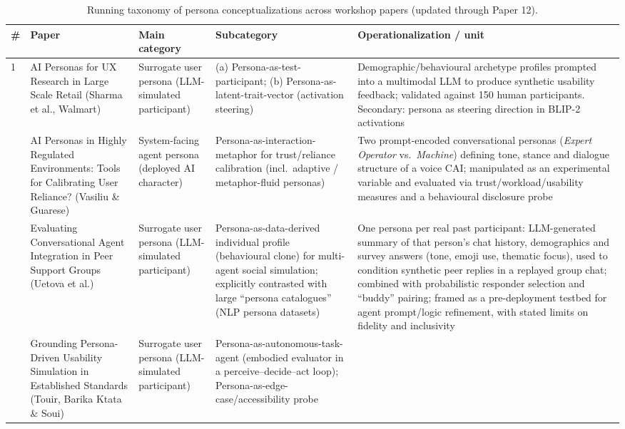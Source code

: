\begin{table}[t]
\centering
\caption{Running taxonomy of persona conceptualizations across workshop papers (updated through Paper 12).}
\label{tab:persona-taxonomy}
\small
\begin{tabular}{p{0.5cm} p{3.6cm} p{3.4cm} p{3.6cm} p{3.6cm}}
\toprule
\textbf{\#} & \textbf{Paper} & \textbf{Main category} & \textbf{Subcategory} & \textbf{Operationalization / unit} \\
\midrule
1 & AI Personas for UX Research in Large Scale Retail (Sharma et al., Walmart) &
Surrogate user persona (LLM-simulated participant) &
(a) Persona-as-test-participant; (b) Persona-as-latent-trait-vector (activation steering) &
Demographic/behavioural archetype profiles prompted into a multimodal LLM to produce synthetic usability feedback; validated against 150 human participants. Secondary: persona as steering direction in BLIP-2 activations \\
\addlinespace
2 & AI Personas in Highly Regulated Environments: Tools for Calibrating User Reliance? (Vasiliu \& Guarese) &
System-facing agent persona (deployed AI character) &
Persona-as-interaction-metaphor for trust/reliance calibration (incl.\ adaptive / metaphor-fluid personas) &
Two prompt-encoded conversational personas (\textit{Expert Operator} vs.\ \textit{Machine}) defining tone, stance and dialogue structure of a voice CAI; manipulated as an experimental variable and evaluated via trust/workload/usability measures and a behavioural disclosure probe \\
\addlinespace
3 & Evaluating Conversational Agent Integration in Peer Support Groups (Uetova et al.) &
Surrogate user persona (LLM-simulated participant) &
Persona-as-data-derived individual profile (behavioural clone) for multi-agent social simulation; explicitly contrasted with large ``persona catalogues'' (NLP persona datasets) &
One persona per real past participant: LLM-generated summary of that person's chat history, demographics and survey answers (tone, emoji use, thematic focus), used to condition synthetic peer replies in a replayed group chat; combined with probabilistic responder selection and ``buddy'' pairing; framed as a pre-deployment testbed for agent prompt/logic refinement, with stated limits on fidelity and inclusivity \\
\addlinespace
4 & Grounding Persona-Driven Usability Simulation in Established Standards (Touir, Barika Ktata \& Soui) &
Surrogate user persona (LLM-simulated participant) &
Persona-as-autonomous-task-agent (embodied evaluator in a perceive--decide--act loop); Persona-as-edge-case/accessibility probe &

\end{tabular}
\end{table}
